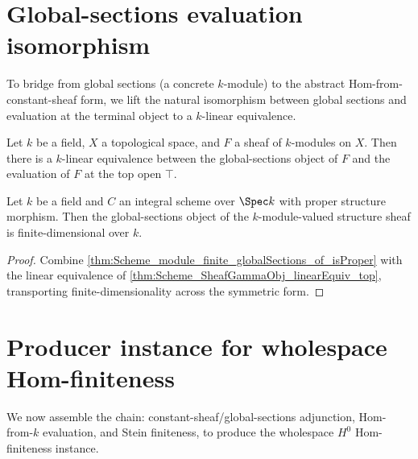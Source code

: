\section{Global-sections evaluation isomorphism}
\label{sec:gammaObj_linearEquiv_top}

To bridge from global sections (a concrete \(k\)-module) to the abstract Hom-from-constant-sheaf form, we lift the natural isomorphism between global sections and evaluation at the terminal object to a \(k\)-linear equivalence.

\begin{theorem}
  \label{thm:Scheme_SheafGammaObj_linearEquiv_top}
  
  Let \(k\) be a field, \(X\) a topological space, and \(F\) a sheaf of \(k\)-modules on \(X\). Then there is a \(k\)-linear equivalence between the global-sections object of \(F\) and the evaluation of \(F\) at the top open \(\top\).
\end{theorem}

\begin{theorem}
  \label{thm:Scheme_module_finite_gammaObj_of_isProper}
  Let \(k\) be a field and \(C\) an integral scheme over \(\Spec k\) with proper structure morphism. Then the global-sections object of the \(k\)-module-valued structure sheaf is finite-dimensional over \(k\).
\end{theorem}

\begin{proof}
  
  \leanok
  Combine \cref{thm:Scheme_module_finite_globalSections_of_isProper} with the linear equivalence of \cref{thm:Scheme_SheafGammaObj_linearEquiv_top}, transporting finite-dimensionality across the symmetric form.
\end{proof}

\section{Producer instance for wholespace Hom-finiteness}
\label{sec:IsHModuleHomFinite_producer}

We now assemble the chain: constant-sheaf/global-sections adjunction, Hom-from-\(k\) evaluation, and Stein finiteness, to produce the wholespace \(H^0\) Hom-finiteness instance.


